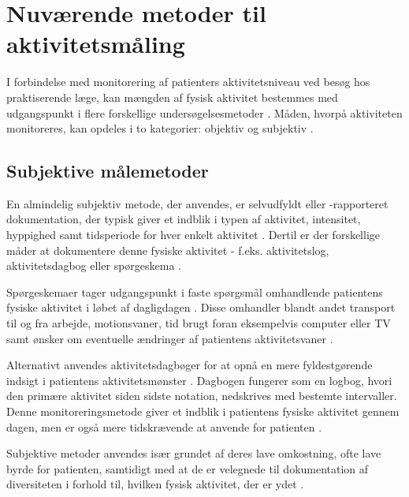 \section{Nuværende metoder til aktivitetsmåling} \label{NuMetode}

I forbindelse med monitorering af patienters aktivitetsniveau ved besøg hos praktiserende læge, kan mængden af fysisk aktivitet bestemmes med udgangspunkt i flere forskellige undersøgelsesmetoder \citep{motionsraad2007}. 
Måden, hvorpå aktiviteten monitoreres, kan opdeles i to kategorier: objektiv og subjektiv \citep{motionsraad2007, adamo2009}. 
 
\subsection{Subjektive målemetoder}

En almindelig subjektiv metode, der anvendes, er selvudfyldt eller -rapporteret dokumentation, der typisk giver et indblik i typen af aktivitet, intensitet, hyppighed samt tidsperiode for hver enkelt aktivitet \citep{adamo2009}. Dertil er der forskellige måder at dokumentere denne fysiske aktivitet - f.eks. aktivitetslog, aktivitetsdagbog eller spørgeskema \citep{adamo2009}. 


Spørgeskemaer tager udgangspunkt i faste spørgsmål omhandlende patientens fysiske aktivitet i løbet af dagligdagen \citep{muller2009}. 
Disse omhandler blandt andet transport til og fra arbejde, motionsvaner, tid brugt foran eksempelvis computer eller TV samt ønsker om eventuelle ændringer af patientens aktivitetsvaner \citep{motionsraad2007, vestergaard2012}. 

Alternativt anvendes aktivitetsdagbøger for at opnå en mere fyldestgørende indsigt i patientens aktivitetsmønster \citep{motionsraad2007,muller2009}. 
Dagbogen fungerer som en logbog, hvori den primære aktivitet siden sidste notation, nedskrives med bestemte intervaller. 
Denne monitoreringsmetode giver et indblik i patientens fysiske aktivitet gennem dagen, men er også mere tidskrævende at anvende for patienten \citep{motionsraad2007}.


Subjektive metoder anvendes især grundet af deres lave omkostning, ofte lave byrde for patienten, samtidigt med at de er velegnede til dokumentation af diversiteten i forhold til, hvilken fysisk aktivitet, der er ydet \citep{adamo2009}.

